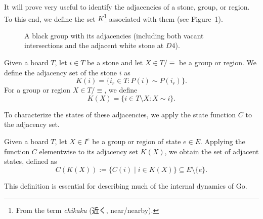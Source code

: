 It will prove very useful to identify the adjacencies of a stone, group, or region.
To this end, we define the set $K$\footnote{From the term \emph{chikaku} (近く, near/nearby).}
associated with them (see Figure~\ref{ejemplo_adyacencias}).
\begin{figure}[H]
	\centering
	\begin{goban}[7, hoshi = false]
	\end{goban}
	\caption{A black group with its \textcolor{Moss}{adjacencies} (including both vacant intersections and the adjacent white stone at $D4$).}
	\label{ejemplo_adyacencias}
\end{figure}

\begin{definition}\label{def_adjacency}
	Given a board $T$, let $i \in T$ be a stone and let $X \in T / {\equiv}$ be a group or region. We define the adjacency set of the stone $i$ as
	\[
	K(i) = \{ i_r \in T : P(i) \sim P(i_r) \}.
	\]
	For a group or region $X \in T / {\equiv}$, we define
	\[
	K(X) = \{ i \in T \setminus X : X \sim i \}.
	\]
\end{definition}


To characterize the states of these adjacencies, we apply the state function $C$ to the adjacency set.

\begin{definition}
	Given a board $T$, let $X \in I^e$ be a group or region of state $e \in E$. Applying the function $C$ elementwise to its adjacency set $K(X)$, we obtain the set of adjacent states, defined as
	\[
	C(K(X)) := \{ C(i) \mid i \in K(X) \} \subseteq E \setminus \{e\}.
	\]
\end{definition}

This definition is essential for describing much of the internal dynamics of Go.

